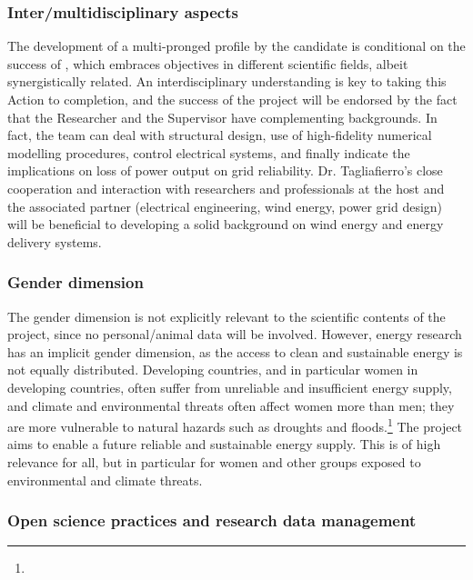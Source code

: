 


\vspace{-3ex}\subsubsection*{Inter/multidisciplinary aspects}\vspace{-1ex}

The development of a multi-pronged profile by the candidate is conditional on the success of \nameAction, which embraces objectives in different scientific fields, albeit synergistically related. An interdisciplinary understanding is key to taking this Action to completion, and the success of the project will be endorsed by the fact that the Researcher and the Supervisor have complementing backgrounds. In fact, the team can deal with structural design, use of high-fidelity numerical modelling procedures, control electrical systems, and finally indicate the implications on loss of power output on grid reliability. Dr. Tagliafierro's close cooperation and interaction with researchers and professionals at the host and the associated partner (electrical engineering, wind energy, power grid design) will be beneficial to developing a solid background on wind energy and energy delivery systems. 


\vspace{-2ex}\subsubsection*{Gender dimension}\vspace{-1ex}
The gender dimension is not explicitly relevant to the scientific contents of the project, since no personal/animal data will be involved. However, energy research has an implicit gender dimension, as the access to clean and sustainable energy is not equally distributed. Developing countries, and in particular women in developing countries, often suffer from unreliable and insufficient energy supply, and climate and environmental threats often affect women more than men; they are more vulnerable to natural hazards such as droughts and floods.\footnote{} The project aims to enable a future reliable and sustainable energy supply. This is of high relevance for all, but in particular for women and other groups exposed to environmental and climate threats.
%
\vspace{-2ex} \subsubsection*{Open science practices and research data management}\vspace{-1ex}


